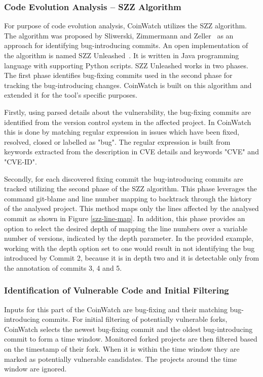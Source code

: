     \subsubsection*{Code Evolution Analysis -- SZZ Algorithm}
    For purpose of code evolution analysis, CoinWatch utilizes the SZZ algorithm. The algorithm was proposed
    by Sliwerski, Zimmermann and Zeller~\cite{SZZalgorithm} as an approach for identifying bug-introducing
    commits. An open implementation of the algorithm is named SZZ Unleashed~\cite{SZZunleashed}. It is written
    in Java programming language with supporting Python scripts. SZZ Unleashed works in two phases. The first
    phase identifies bug-fixing commits used in the second phase for tracking the bug-introducing changes.
    CoinWatch is built on this algorithm and extended it for the tool's specific purposes.

    Firstly, using parsed details about the vulnerability, the bug-fixing commits are identified from
    the version control system in the affected project. In CoinWatch this is done by matching regular expression
    in issues which have been fixed, resolved, closed or labelled as "bug". The regular expression is built
    from keywords extracted from the description in CVE details and keywords "CVE" and "CVE-ID".

    Secondly, for each discovered fixing commit the bug-introducing commits are tracked utilizing the second
    phase of the SZZ algorithm. This phase leverages the command git-blame and line number mapping to backtrack
    through the history of the analysed project. This method maps only the lines affected by the
    analysed commit as shown in Figure \ref{szz-line-map}. In addition, this phase provides an option to
    select the desired depth of mapping the line numbers over a variable number of versions, indicated by
    the depth parameter. In the provided example, working with the depth option set to one would result in
    not identifying the bug introduced by Commit 2, because it is in depth two and it is detectable only from
    the annotation of commits 3, 4 and 5.

    \subsubsection*{Identification of Vulnerable Code and Initial Filtering}
    Inputs for this part of the CoinWatch are bug-fixing and their matching bug-introducing commits.
    For initial filtering of potentially vulnerable forks, CoinWatch selects the newest bug-fixing commit
    and the oldest bug-introducing commit to form a time window. Monitored forked projects are then filtered
    based on the timestamp of their fork. When it is within the time window they are marked as potentially
    vulnerable candidates. The projects around the time window are ignored.

